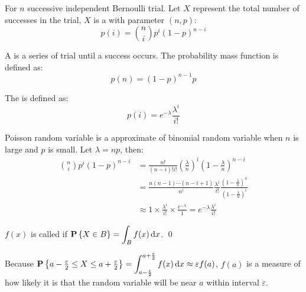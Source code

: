 \begin{definition}
    For $n$ successive independent Bernoulli trial. Let $X$ represent the total number of successes in the trial, $X$ is a  with parameter $(n, p)$:
    \begin{equation}
        p(i) = \binom{n}{i} p^i (1-p)^{n - i}
    \end{equation}
\end{definition}

\begin{definition}
    A  is a series of trial until a success occurs. The probability mass function is defined as:
    \begin{equation}
        p(n) = (1-p)^{n-1} p
    \end{equation}
\end{definition}

\begin{definition}
    The  is defined as:
    \begin{equation}
        p(i) = e^{- \lambda} \frac{\lambda^i}{ i !}
    \end{equation}
\end{definition}

Poisson random variable is a approximate of binomial random variable when $n$ is large and $p$ is small. Let $\lambda = np$, then:
\begin{equation*}
    \begin{aligned}
        \binom{n}{i}p^i (1-p)^{n-i} &= \frac{n!}{(n-i)! i!} \left(\frac{\lambda}{n} \right)^i \left(1-\frac{\lambda}{n} \right)^{n-i} \\
        &= \frac{n (n-1) \cdots (n - i + 1)}{n^i} \frac{\lambda^i}{i!} \frac{(1- \frac{\lambda}{n})^n}{(1- \frac{\lambda}{n})^i} \\
        & \approx 1 \times \frac{\lambda^i}{i!} \times \frac{e^{- \lambda}}{1} = e^{- \lambda} \frac{\lambda^i}{ i !}
    \end{aligned}
\end{equation*}

\begin{definition}
    $f(x)$ is called  if $\probability{X \in B} = {\displaystyle \int_B f(x) \dif{x}} $. \qed
\end{definition}

Because $\probability{ a - \frac{\varepsilon}{2} \leq X \leq a + \frac{\varepsilon}{2} } =\displaystyle \int_{a - \frac{\varepsilon}{2}}^{a + \frac{\varepsilon}{2}} f(x) \dif{x} \approx \varepsilon f(a)  $, $f(a)$ is a measure of how likely it is that the random variable will be near $a$ within interval $\varepsilon$.

